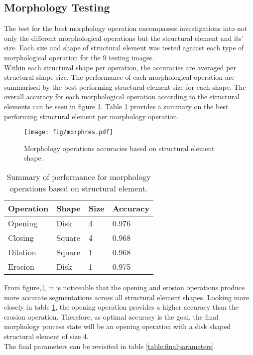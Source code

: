 \subsection{Morphology Testing} 
The test for the best morphology operation encompasses investigations into not only the different morphological operations but the structural element and its' size. Each size and shape of structural element was tested against each type of morphological operation for the 9 testing images. 
\\[1\baselineskip]
Within each structural shape per operation, the accuracies are averaged per structural shape size. The performance of each morphological operation are summarised by the best performing structural element size for each shape. The overall accuracy for each morphological operation according to the structural elements can be seen in figure \ref{fig:morphres}. Table \ref{table:morphres} provides a summary on the best performing structural element per morphology operation.

\begin{figure}[H]
\centering
\texttt{[image: fig/morphres.pdf]}
\caption{Morphology operations accuracies based on structural element shape.}
\label{fig:morphres}
\end{figure}

\begin{table}[H]
\centering
\caption{Summary of performance for morphology operations based on structural element.}

\begin{tabular}{|l|l|l|l|}
\hline
\textbf{Operation} &	\textbf{Shape} & \textbf{Size} & \textbf{Accuracy}\\
\hline
Opening & Disk  & 4  & 0.976\\
\hline				    	 			
Closing & Square & 4  & 0.968\\	
\hline
Dilation & Square & 1 & 0.968\\
\hline
Erosion & Disk & 1 & 0.975\\		    	 
\hline 
\end{tabular}
\label{table:morphres}
\end{table}

From figure,\ref{fig:morphres}, it is noticeable that the opening and erosion operations produce more accurate segmentations across all structural element shapes. Looking more closely in table \ref{table:morphres}, the opening operation provides a higher accuracy than the erosion operation. Therefore, as optimal accuracy is the goal, the final morphology process state will be an opening operation with a disk shaped structural element of size 4.
\\[1\baselineskip]
The final parameters can be revisited in table \ref{table:finalparameters}.
